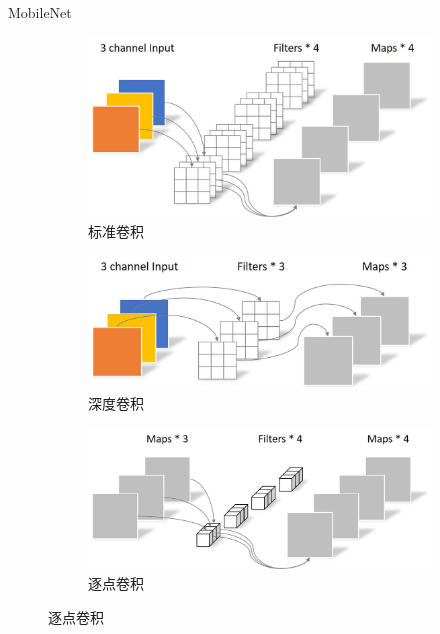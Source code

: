 \documentclass{beamer}
\begin{document}
\begin{frame}{MobileNet}
    \begin{figure}
        \centering
        \begin{subfigure}[b]{0.32\textwidth}
            \centering
            \includegraphics[width=\linewidth]{pic/std_cov.jpg}
            \caption{标准卷积}
        \end{subfigure}
        \begin{subfigure}[b]{0.32\textwidth}
            \centering
            \includegraphics[width=\linewidth]{pic/dpth_cov.jpg}
            \caption{深度卷积}
        \end{subfigure}
        \begin{subfigure}[b]{0.32\textwidth}
            \centering
            \includegraphics[width=\linewidth]{pic/sep_cov.jpg}
            \caption{逐点卷积}
        \end{subfigure}
    \end{figure}
\end{frame}
\end{document}
